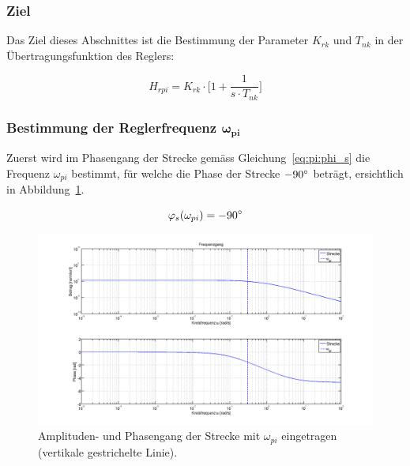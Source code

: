 \subsubsection*{Ziel}
Das  Ziel dieses  Abschnittes ist  die Bestimmung  der Parameter  $K_{rk}$ und
$T_{nk}$ in der \"Ubertragungsfunktion des Reglers:

\begin{equation} \label{eq:pi:target}
    H_{rpi} = K_{rk} \cdot \biggl[ 1 + \frac{1}{s \cdot T_{nk}} \biggr]
\end{equation}


\subsubsection{Bestimmung der Reglerfrequenz $\mathbf{\boldsymbol{\omega}_{pi}}$}

Zuerst  wird im  Phasengang der  Strecke gem\"ass  Gleichung~\ref{eq:pi:phi_s}
die     Frequenz     $\omega_{pi}$      bestimmt,     f\"ur     welche     die
Phase     der    Strecke     $-90\degree$     betr\"agt,    ersichtlich     in
Abbildung~\ref{fig:pi:omega_pi}\footnotemark[4].

\begin{equation} \label{eq:pi:phi_s}
    \varphi_s(\omega_{pi}) = -90 \degree
\end{equation}


\begin{figure}[h! width=\pagewidth]
    \includegraphics[width=\textwidth]{images/piStreckeOmegaPI.png}
    \caption{%
        Amplituden- und  Phasengang der Strecke mit  $\omega_{pi}$ eingetragen
        (vertikale gestrichelte Linie).
    }
    \label{fig:pi:omega_pi}
\end{figure}

